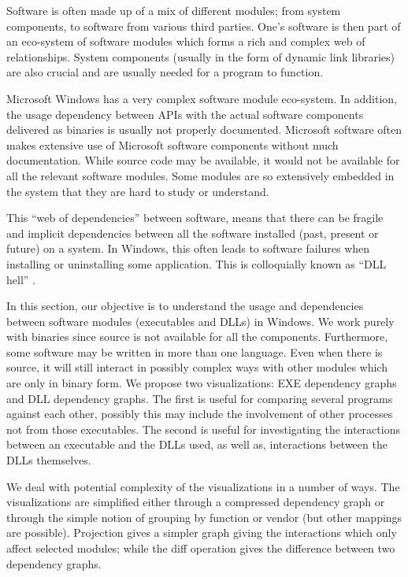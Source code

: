 


Software is often made up of
a mix of different modules; from system components, to
software from various third parties.
One's software is then part of an eco-system of software modules
which forms a rich and complex web of relationships.
System components (usually in the form of dynamic link libraries)
are also crucial and are usually needed for
a program to function.


Microsoft Windows has a very complex software module eco-system.
In addition, the usage dependency between
APIs with the actual software components delivered as binaries
is usually not properly documented.
Microsoft software often makes extensive
use of Microsoft software components without much documentation.
While source code may be available, it would not be available for all
the relevant software modules.
Some modules are so extensively embedded in the system that they are
hard to study or understand.

This ``web of dependencies'' between software,
means that
there can be fragile and implicit dependencies between all the software
installed (past, present or future) on a system.
In Windows, this often leads to software failures when installing or
uninstalling some application.
This is colloquially known as ``DLL hell'' \cite{anderson2000end}.

In this section, our objective is to understand the usage and dependencies
between software modules (executables and DLLs) in Windows.
We work purely with binaries since source is not available for all the
components. Furthermore, some software may be written in more than
one language.
Even when there is source, it will still interact in possibly complex
ways with other modules which are only in binary form.
We propose two visualizations: EXE dependency graphs and DLL dependency
graphs. The first is useful for comparing several programs
against each other, possibly this may include the involvement
of other processes not from those executables.
The second is useful for investigating the interactions between
an executable and the DLLs used, as well as, interactions
between the DLLs themselves.

We deal with potential complexity of the visualizations in a number of ways.
The visualizations are
simplified either through a compressed dependency graph
or through the simple notion of grouping by function
or vendor (but other mappings are possible).
Projection gives a simpler graph giving the interactions which
only affect selected modules; while the diff operation
gives the difference between two dependency graphs.

